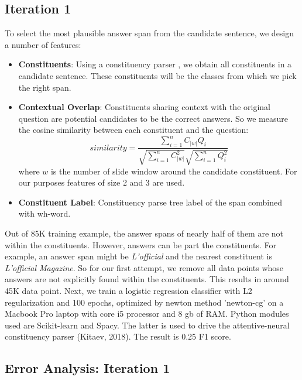\subsection{Iteration 1}
To select the most plausible answer span from the candidate sentence, we design a number of features:
\begin{itemize}
\item \textbf{Constituents}: Using a constituency parser \citep{kitaev2018constituency}, we obtain all constituents in a candidate sentence. These constituents will be the classes from which we pick the right span.
\item \textbf{Contextual Overlap}: Constituents sharing context with the original question are potential candidates to be the correct answers. So we measure the cosine similarity between each constituent and the question:
$${ similarity } = \frac { \sum _ { i = 1 } ^ { n } C _ { |w| } Q _ { i } } { \sqrt { \sum _ { i = 1 } ^ { n } C _ { |w| } ^ { 2 } } \sqrt { \sum _ { i = 1 } ^ { n } Q _ { i } ^ { 2 } } }$$ 
where $w$ is the number of slide window around the candidate constituent. For our purposes features of size 2 and 3 are used. 

\item \textbf{Constituent Label}: Constituency parse tree label of the span combined with wh-word.
\end{itemize}
Out of 85K training example, the answer spans of nearly half of them are not within the constituents. However, answers can be part the constituents.  For example, an answer span might be \textit{L'official} and the nearest constituent is \textit{L'official Magazine}. So for our first attempt, we remove all data points whose answers are not explicitly found within the constituents. This results in around 45K data point. Next, we train a logistic regression classifier with L2 regularization and 100 epochs, optimized by newton method 'newton-cg' on a Macbook Pro laptop with core i5 processor and 8 gb of RAM. Python modules used are Scikit-learn and Spacy. The latter is used to drive the attentive-neural constituency parser (Kitaev, 2018). The result is 0.25 F1 score.




\subsection{Error Analysis: Iteration 1}

